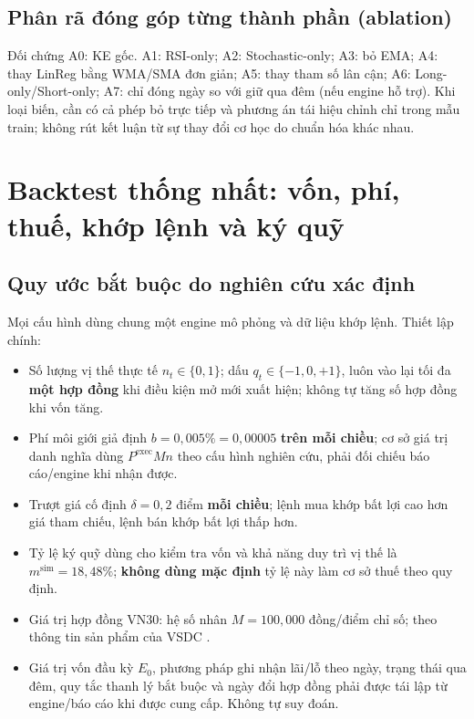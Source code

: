 \documentclass[12pt,a4paper,oneside]{article}
\begin{document}
\subsection{Phân rã đóng góp từng thành phần (ablation)}
Đối chứng A0: KE gốc. A1: RSI-only; A2: Stochastic-only; A3: bỏ EMA; A4: thay LinReg bằng WMA/SMA đơn giản; A5: thay tham số lân cận; A6: Long-only/Short-only; A7: chỉ đóng ngày so với giữ qua đêm (nếu engine hỗ trợ). Khi loại biến, cần có cả phép bỏ trực tiếp và phương án tái hiệu chỉnh chỉ trong mẫu train; không rút kết luận từ sự thay đổi cơ học do chuẩn hóa khác nhau.

\section{Backtest thống nhất: vốn, phí, thuế, khớp lệnh và ký quỹ}\label{sec:backtest}
\subsection{Quy ước bắt buộc do nghiên cứu xác định}
Mọi cấu hình dùng chung một engine mô phỏng và dữ liệu khớp lệnh. Thiết lập chính:
\begin{itemize}
\item Số lượng vị thế thực tế $n_t\in\{0,1\}$; dấu $q_t\in\{-1,0,+1\}$, luôn vào lại tối đa \textbf{một hợp đồng} khi điều kiện mở mới xuất hiện; không tự tăng số hợp đồng khi vốn tăng.
\item Phí môi giới giả định $b=0{,}005\%=0{,}00005$ \textbf{trên mỗi chiều}; cơ sở giá trị danh nghĩa dùng $P^{\mathrm{exec}} M n$ theo cấu hình nghiên cứu, phải đối chiếu báo cáo/engine khi nhận được.
\item Trượt giá cố định $\delta=0{,}2$ điểm \textbf{mỗi chiều}; lệnh mua khớp bất lợi cao hơn giá tham chiếu, lệnh bán khớp bất lợi thấp hơn.
\item Tỷ lệ ký quỹ dùng cho kiểm tra vốn và khả năng duy trì vị thế là $m^{\mathrm{sim}}=18{,}48\%$; \textbf{không dùng mặc định} tỷ lệ này làm cơ sở thuế theo quy định.
\item Giá trị hợp đồng VN30: hệ số nhân $M=100{,}000$ đồng/điểm chỉ số; theo thông tin sản phẩm của VSDC \cite{vsdcproduct}.
\item Giá trị vốn đầu kỳ $E_0$, phương pháp ghi nhận lãi/lỗ theo ngày, trạng thái qua đêm, quy tắc thanh lý bắt buộc và ngày đổi hợp đồng phải được tái lập từ engine/báo cáo khi được cung cấp. Không tự suy đoán.
\end{itemize}
\end{document}
